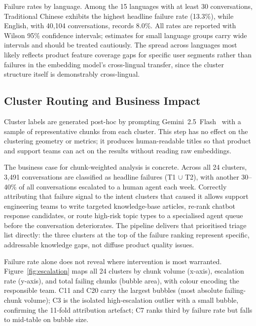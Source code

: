 \documentclass[conference]{IEEEtran}
\begin{document}
Failure rates by language. Among the 15 languages with at least 30 conversations, Traditional Chinese exhibits the highest headline failure rate (13.3\%), while English, with 40{,}104 conversations, records 8.0\%. All rates are reported with Wilson 95\% confidence intervals; estimates for small language groups carry wide intervals and should be treated cautiously. The spread across languages most likely reflects product feature coverage gaps for specific user segments rather than failures in the embedding model's cross-lingual transfer, since the cluster structure itself is demonstrably cross-lingual.

\subsection{Cluster Routing and Business Impact}
\label{sec:routing}

Cluster labels are generated post-hoc by prompting Gemini~2.5~Flash~\cite{gemini2025} with a sample of representative chunks from each cluster. This step has no effect on the clustering geometry or metrics; it produces human-readable titles so that product and support teams can act on the results without reading raw embeddings.

The business case for chunk-weighted analysis is concrete. Across all 24 clusters, 3{,}491 conversations are classified as headline failures (T1 $\cup$ T2), with another 30--40\% of all conversations escalated to a human agent each week. Correctly attributing that failure signal to the intent clusters that caused it allows support engineering teams to write targeted knowledge-base articles, re-rank chatbot response candidates, or route high-risk topic types to a specialised agent queue before the conversation deteriorates. The pipeline delivers that prioritised triage list directly: the three clusters at the top of the failure ranking represent specific, addressable knowledge gaps, not diffuse product quality issues.

Failure rate alone does not reveal where intervention is most warranted. Figure~\ref{fig:escalation} maps all 24 clusters by chunk volume (x-axis), escalation rate (y-axis), and total failing chunks (bubble area), with colour encoding the responsible team. C11 and C20 carry the largest bubbles (most absolute failing-chunk volume); C3 is the isolated high-escalation outlier with a small bubble, confirming the 11-fold attribution artefact; C7 ranks third by failure rate but falls to mid-table on bubble size.
\end{document}
